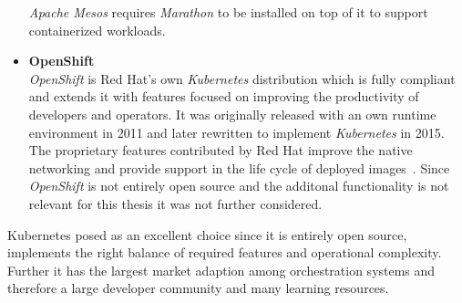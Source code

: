 \begin{itemize}
{    \textit{Apache Mesos} requires \textit{Marathon} to be installed on top of it to support containerized workloads.
    ~\cite{mesos, Orch2}
    }
    \item[]{\textbf{OpenShift}\\
    \textit{OpenShift} is Red Hat's own \textit{Kubernetes} distribution which is fully compliant and extends it with features focused on improving the productivity of developers and operators.
    It was originally released with an own runtime environment in 2011 and later rewritten to implement \textit{Kubernetes} in 2015.
    The proprietary features contributed by Red Hat improve the native networking and provide support in the life cycle of deployed images~\cite{Openshift}.
    Since \textit{OpenShift} is not entirely open source and the additonal functionality is not relevant for this thesis it was not further considered.
    }
\end{itemize}
Kubernetes posed as an excellent choice since it is entirely open source, implements the right balance of required features and operational complexity.
Further it has the largest market adaption among orchestration systems and therefore a large developer community and many learning resources.